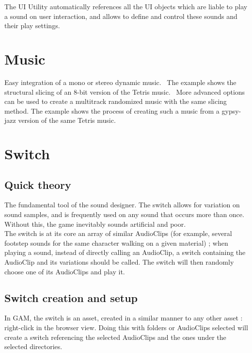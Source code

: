 \documentclass[a4paper,10pt]{article}
\begin{document}
The UI Utility automatically references all the UI objects which are liable to play a sound on user interaction, and allows to define and control these sounds and their play settings.


\section{Music}

Easy integration of a mono or stereo dynamic music. \
The example shows the structural slicing of an 8-bit version of the Tetris music. \
More advanced options can be used to create a multitrack randomized music with the same slicing method. The example shows the process of creating such a music from a gypsy-jazz version of the same Tetris music.


\section{Switch} \label{sec:switch}

\subsection{Quick theory}
The fundamental tool of the sound designer. The switch allows for variation on sound samples, and is frequently used on any sound that occurs more than once. Without this, the game inevitably sounds artificial and poor.\\

The switch is at its core an array of similar AudioClips (for example, several footstep sounds for the same character walking on a given material) ; when playing a sound, instead of directly calling an AudioClip, a switch containing the AudioClip and its variations should be called. The switch will then randomly choose one of its AudioClips and play it.

\subsection{Switch creation and setup}

In GAM, the switch is an asset, created in a similar manner to any other asset : right-click in the browser view. Doing this with folders or AudioClips selected will create a switch referencing the selected AudioClips and the ones under the selected directories. \\
\end{document}
